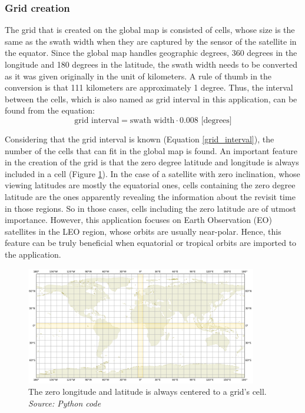 \bigskip
\subsubsection{Grid creation}
\bigskip

The grid that is created on the global map is consisted of cells, whose size is the same as the swath width when they are captured by the sensor of the satellite in the equator. Since the global map handles geographic degrees, 360 degrees in the longitude and 180 degrees in the latitude, the swath width needs to be converted as it was given originally in the unit of kilometers. A rule of thumb in the conversion is that 111 kilometers are approximately 1 degree. Thus, the interval between the cells, which is also named as grid interval in this application, can be found from the equation:
\begin{equation}
\label{grid_interval}
\text{grid interval} = \text{swath width} \cdot 0.008 \text{ [degrees]}
\end{equation}

Considering that the grid interval is known (Equation \ref{grid_interval}), the number of the cells that can fit in the global map is found. An important feature in the creation of the grid is that the zero degree latitude and longitude is always included in a cell (Figure \ref{map_projection_0covered}). In the case of a satellite with zero inclination, whose viewing latitudes are mostly the equatorial ones, cells containing the zero degree latitude are the ones apparently revealing the information about the revisit time in those regions. So in those cases, cells including the zero latitude are of utmost importance. However, this application focuses on Earth Observation (EO) satellites in the LEO region, whose orbits are usually near-polar. Hence, this feature can be truly beneficial when equatorial or tropical orbits are imported to the application.

\begin{figure}
\centering
\includegraphics[width=0.9\textwidth]{Images/map_projection_0covered.png}\caption{The zero longitude and latitude is always centered to a grid's cell. \textit{Source: Python code}}
\label{map_projection_0covered}
\end{figure}

